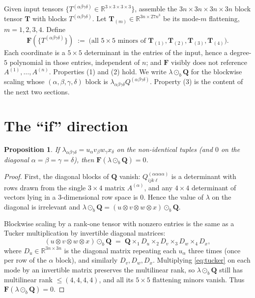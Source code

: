 \documentclass[11pt]{article}
\newcommand{\R}{\mathbb{R}}
\newcommand{\bQ}{\mathbf{Q}}
\newcommand{\bF}{\mathbf{F}}
\newtheorem{proposition}{Proposition}
\begin{document}
Given input tensors $\{T^{(\alpha\beta\gamma\delta)}\in\R^{3\times3\times3\times3}\}$,
assemble the $3n\times3n\times3n\times3n$ block tensor $\mathbf T$ with blocks
$T^{(\alpha\beta\gamma\delta)}$. Let $\mathbf T_{(m)}\in\R^{3n\times27n^{3}}$ be
its mode-$m$ flattening, $m=1,2,3,4$. Define
\[
  \bF(\{T^{(\alpha\beta\gamma\delta)}\})
   \;:=\;\bigl(\text{all }5\times5\text{ minors of }\mathbf T_{(1)},\mathbf T_{(2)},\mathbf T_{(3)},\mathbf T_{(4)}\bigr).
\]
Each coordinate is a $5\times5$ determinant in the entries of the input, hence a
degree-$5$ polynomial in those entries, independent of $n$; and $\bF$ visibly
does not reference $A^{(1)},\dots,A^{(n)}$. Properties (1) and (2) hold. We
write $\lambda\odot_b\bQ$ for the blockwise scaling whose
$(\alpha,\beta,\gamma,\delta)$ block is $\lambda_{\alpha\beta\gamma\delta}Q^{(\alpha\beta\gamma\delta)}$.
Property (3) is the content of the next two sections.

\section*{The ``if'' direction}

\begin{proposition}\label{prop:if}
If $\lambda_{\alpha\beta\gamma\delta}=u_\alpha v_\beta w_\gamma x_\delta$ on the
non-identical tuples (and $0$ on the diagonal $\alpha=\beta=\gamma=\delta$), then
$\bF(\lambda\odot_b\bQ)=0$.
\end{proposition}

\begin{proof}
First, the diagonal blocks of $\bQ$ vanish: $Q^{(\alpha\alpha\alpha\alpha)}_{ijk\ell}$
is a determinant with rows drawn from the single $3\times4$ matrix $A^{(\alpha)}$,
and any $4\times4$ determinant of vectors lying in a $3$-dimensional row space is
$0$. Hence the value of $\lambda$ on the diagonal is irrelevant and
$\lambda\odot_b\bQ=(u\otimes v\otimes w\otimes x)\odot_b\bQ$.

Blockwise scaling by a rank-one tensor with nonzero entries is the same as a
Tucker multiplication by invertible diagonal matrices:
\[
  (u\otimes v\otimes w\otimes x)\odot_b\bQ
   \;=\;\bQ\times_1 D_u\times_2 D_v\times_3 D_w\times_4 D_x,
\]
where $D_u\in\R^{3n\times3n}$ is the diagonal matrix repeating each $u_\alpha$
three times (once per row of the $\alpha$ block), and similarly $D_v,D_w,D_x$.
Multiplying \eqref{eq:tucker} on each mode by an invertible matrix preserves the
multilinear rank, so $\lambda\odot_b\bQ$ still has multilinear rank
$\le(4,4,4,4)$, and all its $5\times5$ flattening minors vanish. Thus
$\bF(\lambda\odot_b\bQ)=0$.
\end{proof}
\end{document}
